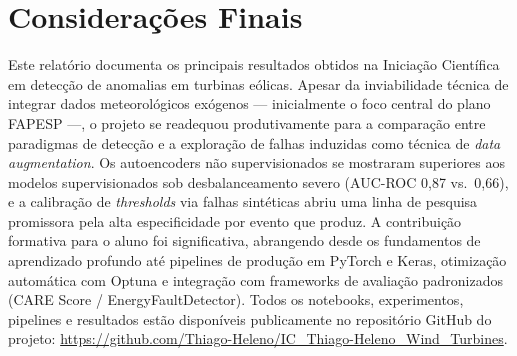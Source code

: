 \documentclass[12pt]{article}
\begin{document}
\section{Considerações Finais}

Este relatório documenta os principais resultados obtidos na Iniciação Científica em detecção de anomalias em turbinas eólicas. Apesar da inviabilidade técnica de integrar dados meteorológicos exógenos --- inicialmente o foco central do plano FAPESP ---, o projeto se readequou produtivamente para a comparação entre paradigmas de detecção e a exploração de falhas induzidas como técnica de \textit{data augmentation}. Os autoencoders não supervisionados se mostraram superiores aos modelos supervisionados sob desbalanceamento severo (AUC-ROC 0,87 vs.\ 0,66), e a calibração de \textit{thresholds} via falhas sintéticas abriu uma linha de pesquisa promissora pela alta especificidade por evento que produz. A contribuição formativa para o aluno foi significativa, abrangendo desde os fundamentos de aprendizado profundo até pipelines de produção em PyTorch e Keras, otimização automática com Optuna e integração com frameworks de avaliação padronizados (CARE Score / EnergyFaultDetector). Todos os notebooks, experimentos, pipelines e resultados estão disponíveis publicamente no repositório GitHub do projeto: \url{https://github.com/Thiago-Heleno/IC_Thiago-Heleno_Wind_Turbines}.

\nocite{*}


\end{document}
